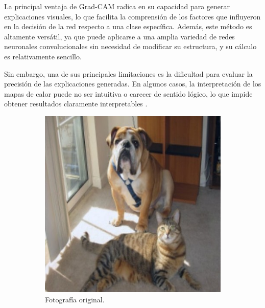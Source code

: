 La principal ventaja de Grad-CAM radica en su capacidad para generar explicaciones visuales, lo que facilita la comprensión de los factores que influyeron en la decisión de la red respecto a una clase específica. Además, este método es altamente versátil, ya que puede aplicarse a una amplia variedad de redes neuronales convolucionales sin necesidad de modificar su estructura, y su cálculo es relativamente sencillo.

Sin embargo, una de sus principales limitaciones es la dificultad para evaluar la precisión de las explicaciones generadas. En algunos casos, la interpretación de los mapas de calor puede no ser intuitiva o carecer de sentido lógico, lo que impide obtener resultados claramente interpretables \cite{molnar2025}.

\begin{figure}[!h]  
    \centering
    \begin{subfigure}{0.28\textwidth}
        \includegraphics[width=\textwidth]{figures/2_theory/grad_cam__og.jpg}
        \begin{minipage}{.1cm}
            \vfill
            \end{minipage}
        \caption{Fotografía original.}
        \label{fig__grad_cam__og}
    \end{subfigure}
    \begin{subfigure}{0.28\textwidth}

\end{subfigure}
\end{figure}
